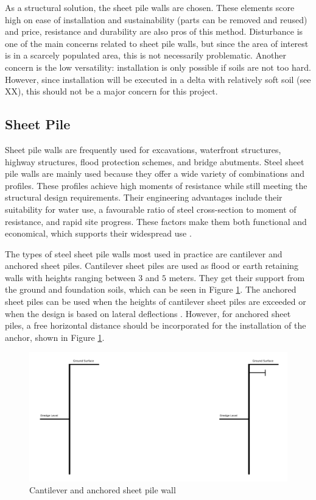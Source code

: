 As a structural solution, the sheet pile walls are chosen. These elements score high on ease of installation and sustainability (parts can be removed and reused) and price, resistance and durability are also pros of this method. Disturbance is one of the main concerns related to sheet pile walls, but since the area of interest is in a scarcely populated area, this is not necessarily problematic. Another concern is the low versatility: installation is only possible if soils are not too hard. However, since installation will be executed in a delta with relatively soft soil (see XX), this should not be a major concern for this project.

\subsection{Sheet Pile}
\label{section:sheet_pile_wall}

Sheet pile walls are frequently used for excavations, waterfront structures, highway structures, flood protection schemes, and bridge abutments. Steel sheet pile walls are mainly used because they offer a wide variety of combinations and profiles. These profiles achieve high moments of resistance while still meeting the structural design requirements. Their engineering advantages include their suitability for water use, a favourable ratio of steel cross-section to moment of resistance, and rapid site progress. These factors make them both functional and economical, which supports their widespread use \autocite{grabeSheetPilingHandbook2008}.


The types of steel sheet pile walls most used in practice are cantilever and anchored sheet piles. Cantilever sheet piles are used as flood or earth retaining walls with heights ranging between $3$ and $5$ meters. They get their support from the ground and foundation soils, which can be seen in Figure \ref{fig:sheetpiles}. The anchored sheet piles can be used when the heights of cantilever sheet piles are exceeded or when the design is based on lateral deflections \autocite{brownDesignSheetPile1994}. However, for anchored sheet piles, a free horizontal distance should be incorporated for the installation of the anchor, shown in Figure \ref{fig:sheetpiles}.

\begin{figure}[H]
    \centering
    \includegraphics[width=0.70\linewidth]{figures/ch8/cantilever_anchored.png}
    \caption{Cantilever and anchored sheet pile wall}
    \label{fig:sheetpiles}
\end{figure}

